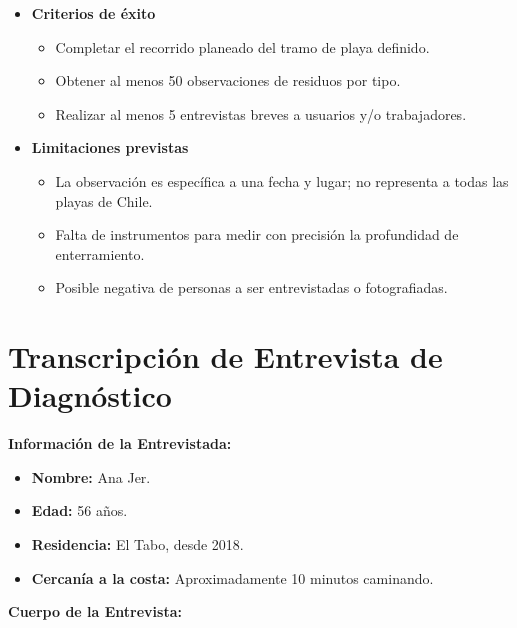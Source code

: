 \documentclass[12pt]{article}
\begin{document}
\begin{itemize}
    \item \textbf{Criterios de éxito}
    \begin{itemize}
        \item Completar el recorrido planeado del tramo de playa definido.
        \item Obtener al menos 50 observaciones de residuos por tipo.
        \item Realizar al menos 5 entrevistas breves a usuarios y/o trabajadores.
    \end{itemize}

    \item \textbf{Limitaciones previstas}
    \begin{itemize}
        \item La observación es específica a una fecha y lugar; no representa a todas las playas de Chile.
        \item Falta de instrumentos para medir con precisión la profundidad de enterramiento.
        \item Posible negativa de personas a ser entrevistadas o fotografiadas.
    \end{itemize}
\end{itemize}


\section{Transcripción de Entrevista de Diagnóstico}


\textbf{Información de la Entrevistada:}
\begin{itemize}
    \item \textbf{Nombre:} Ana Jer.
    \item \textbf{Edad:} 56 años.
    \item \textbf{Residencia:} El Tabo, desde 2018.
    \item \textbf{Cercanía a la costa:} Aproximadamente 10 minutos caminando.
\end{itemize}

\textbf{Cuerpo de la Entrevista:}
\end{document}
